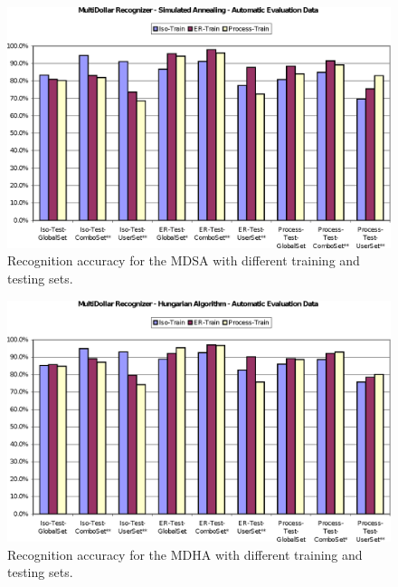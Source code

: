\documentclass[final,5p,twocolumn]{elsarticle}
\begin{document}
\begin{figure}[p]
\begin{center}
\includegraphics[width=.9\hsize]{MultiDollarSAAutoChart.eps}
\end{center}
\caption{Recognition accuracy for the MDSA with different training and testing sets. }
\label{MultiDollarSAAuto}
\end{figure}

\begin{figure}[p]
\begin{center}
\includegraphics[width=.9\hsize]{MultiDollarHAAutoChart.eps}
\end{center}
\caption{Recognition accuracy for the MDHA with different training and testing sets. }
\label{MultiDollarHAAuto}
\end{figure}
\end{document}
